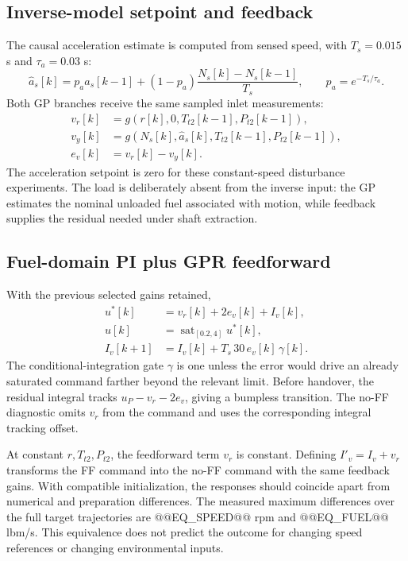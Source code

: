 \subsection{Inverse-model setpoint and feedback}
The causal acceleration estimate is computed from sensed speed, with $T_s=0.015$ s and $\tau_a=0.03$ s:
\begin{equation}
\hat a_s[k]=p_a\hat a_s[k-1]+(1-p_a)\frac{N_s[k]-N_s[k-1]}{T_s},\qquad p_a=e^{-T_s/\tau_a}.
\end{equation}
Both GP branches receive the same sampled inlet measurements:
\begin{align}
v_r[k]&=g(r[k],0,T_{t2}[k-1],P_{t2}[k-1]),\\
v_y[k]&=g(N_s[k],\hat a_s[k],T_{t2}[k-1],P_{t2}[k-1]),\\
e_v[k]&=v_r[k]-v_y[k].
\end{align}
The acceleration setpoint is zero for these constant-speed disturbance experiments. The load is deliberately absent from the inverse input: the GP estimates the nominal unloaded fuel associated with motion, while feedback supplies the residual needed under shaft extraction.

\subsection{Fuel-domain PI plus GPR feedforward}
With the previous selected gains retained,
\begin{align}
u^*[k]&=v_r[k]+2e_v[k]+I_v[k],\\
u[k]&=\operatorname{sat}_{[0.2,4]}u^*[k],\\
I_v[k+1]&=I_v[k]+T_s\,30\,e_v[k]\,\gamma[k].
\end{align}
The conditional-integration gate $\gamma$ is one unless the error would drive an already saturated command farther beyond the relevant limit. Before handover, the residual integral tracks $u_P-v_r-2e_v$, giving a bumpless transition. The no-FF diagnostic omits $v_r$ from the command and uses the corresponding integral tracking offset.

At constant $r,T_{t2},P_{t2}$, the feedforward term $v_r$ is constant. Defining $I'_v=I_v+v_r$ transforms the FF command into the no-FF command with the same feedback gains. With compatible initialization, the responses should coincide apart from numerical and preparation differences. The measured maximum differences over the full target trajectories are @@EQ_SPEED@@ rpm and @@EQ_FUEL@@ lbm/s. This equivalence does not predict the outcome for changing speed references or changing environmental inputs.

